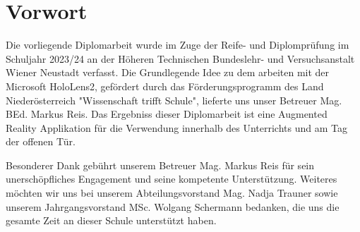 \chapter{Vorwort}

Die vorliegende Diplomarbeit wurde im Zuge der Reife- und Diplomprüfung im Schuljahr 2023/24 an der Höheren Technischen
Bundeslehr- und Versuchsanstalt Wiener Neustadt verfasst. Die Grundlegende Idee zu dem arbeiten mit der Microsoft HoloLens2,
gefördert durch das Förderungsprogramm des Land Niederösterreich "Wissenschaft trifft Schule", lieferte uns unser Betreuer
Mag. BEd. Markus Reis. Das Ergebniss dieser Diplomarbeit ist eine Augmented Reality Applikation für die Verwendung innerhalb
des Unterrichts und am Tag der offenen Tür.

Besonderer Dank gebührt unserem Betreuer Mag. Markus Reis  für sein unerschöpfliches Engagement und seine kompetente
Unterstützung. Weiteres möchten wir uns bei unserem Abteilungsvorstand Mag. Nadja Trauner sowie unserem Jahrgangsvorstand
MSc. Wolgang Schermann bedanken, die uns die gesamte Zeit an dieser Schule unterstützt haben.
